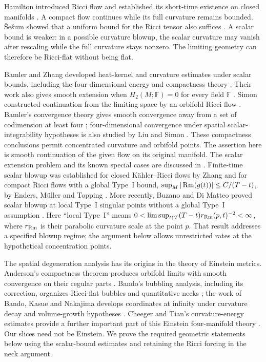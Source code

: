 Hamilton introduced Ricci flow and established its short-time existence
on closed manifolds \cite{Hamilton1982}. A compact flow continues while
its full curvature remains bounded. \v{S}e\v{s}um showed that a uniform
bound for the Ricci tensor also suffices \cite{Sesum2005}. A scalar bound
is weaker: in a possible curvature blowup, the scalar curvature may
vanish after rescaling while the full curvature stays nonzero. The
limiting geometry can therefore be Ricci-flat without being flat.

Bamler and Zhang developed heat-kernel and curvature estimates under
scalar bounds, including the four-dimensional energy and compactness
theory \cite{BamlerZhangI,BamlerZhangII}. Their work also gives smooth
extension when \(H_2(M;\mathbb F)=0\) for every field \(\mathbb F\)
\cite[arXiv version, Corollary~1.10]{BamlerZhangI}. Simon constructed
continuation from the limiting space by an orbifold Ricci flow
\cite{SimonExtension}. Bamler's convergence theory gives smooth
convergence away from a set of codimension at least four
\cite{BamlerConvergence};
four-dimensional convergence under spatial scalar-integrability
hypotheses is also studied by Liu and Simon \cite{LiuSimon}.
These compactness conclusions permit concentrated curvature and
orbifold points. The assertion here is smooth continuation of the given
flow on its original manifold. The scalar extension problem and its
known special cases are discussed in \cite[Section~2]{LiLiSurvey}.
Finite-time scalar blowup was established for closed K\"ahler--Ricci
flows by Zhang \cite{Zhang2010Kahler} and for compact Ricci flows with
a global Type~I bound, $\sup_M|\operatorname{Rm}(g(t))|\le C/(T-t)$, by
Enders, M\"uller and Topping \cite{EndersMuellerTopping2011}.
More recently, Buzano and Di Matteo proved scalar blowup at local
Type~I singular points without a global Type~I assumption
\cite[Definition~1.4 and Theorem~1.1]{BuzanoDiMatteo2026}.
Here ``local Type~I'' means
\(0<\limsup_{t\uparrow T}(T-t)r_{\operatorname{Rm}}(p,t)^{-2}<\infty\),
where \(r_{\operatorname{Rm}}\) is their parabolic curvature scale at the point \(p\).
That result addresses a specified blowup regime; the argument below
allows unrestricted rates at the hypothetical concentration points.

The spatial degeneration analysis has its origins in the theory of
Einstein metrics. Anderson's compactness theorem produces orbifold
limits with smooth convergence on their regular parts
\cite[Theorem~C]{Anderson1989}. Bando's bubbling analysis, including
its correction, organizes Ricci-flat bubbles and quantitative necks
\cite{Bando1990,BandoCorrection1990}; the work of Bando, Kasue and
Nakajima develops coordinates at infinity under curvature decay and
volume-growth hypotheses \cite{BandoKasueNakajima1989}.
Cheeger and Tian's curvature-energy estimates provide a further
important part of this Einstein four-manifold theory
\cite{CheegerTian2006}. Our slices need not be Einstein. We prove
the required geometric statements below using the scalar-bound
estimates and retaining the Ricci forcing in the neck argument.

